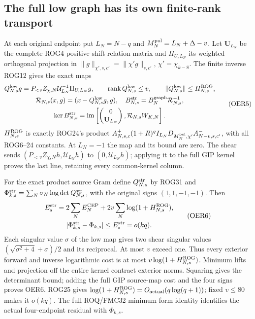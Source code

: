 \documentclass[11pt,a4paper]{article}
\begin{document}
\subsection{The full low graph has its own finite-rank transport}

At each original endpoint put $L_N=N-q$ and
$M_N^{\rm pol}=L_N+\Delta-v$. Let $\mathbf U_{L_N}$ be the
complete ROG4 positive-shift relation matrix and
$\Pi_{U,L_N}$ its weighted orthogonal projection in
$\|g\|_{\chi',s,c'}=\|\chi'g\|_{s,c'}$, $\chi'=\chi_{k-8}$.
The finite inverse ROG12 gives the exact maps
\[
\begin{gathered}
 Q_{N,s}^{\rm low}g
 =P_{<v}Z_{\chi,N}\mathcal U_{L_N}^{-1}\Pi_{U,L_N}g,\qquad
 \operatorname{rank}Q_{N,s}^{\rm low}\le v,\qquad
 \|Q_{N,s}^{\rm low}\|\le H_{N,s}^{\rm ROG},\\
 \mathcal R_{N,s}(x,g)=(x-Q_{N,s}^{\rm low}g,g),\quad
 B_{N,s}^{\rm str}=B_N^{\rm graph}\mathcal R_{N,s}^{-1},\\
 \ker B_{N,s}^{\rm str}
 =\operatorname{im}\left[
   \begin{pmatrix}0\\\mathbf U_{L_N}\end{pmatrix},
                       \mathcal R_{N,s}W_{K,N}\right].
\end{gathered}\tag{OER5}
\]
$H_{N,s}^{\rm ROG}$ is exactly ROG24's product
$A^+_{N,s,c}(1+R)^q I_{L_N}D_{M_N^{\rm pol},\chi'}
A^-_{N-v,s,c'}$, with all ROG6--24 constants.
At $L_N=-1$ the map and its bound are zero.
The shear sends
$(P_{<v}Z_{\chi,N}h,\mathcal U_{L_N}h)$ to
$(0,\mathcal U_{L_N}h)$; applying it to the full GIP kernel
proves the last line, retaining every common-kernel column.

For the exact product source Gram define $Q_{N,s}^{\rm str}$
by ROG31 and
$\Phi_{k,s}^{\rm str}=\sum_N\sigma_N\log\det Q_{N,s}^{\rm str}$,
with the original signs $(1,1,-1,-1)$. Then
\[
\begin{gathered}
 E_s^{\rm str}
 =2\sum_NE_N^{\rm CEP}
       +2v\sum_N\log(1+H_{N,s}^{\rm ROG}),\\
 |\Phi_{k,s}^{\rm str}-\Phi_{k,s}|
       \le E_s^{\rm str}=o(kq).
\end{gathered}\tag{OER6}
\]
Each singular value $\sigma$ of the low map gives two shear
singular values $(\sqrt{\sigma^2+4}+\sigma)/2$ and its reciprocal.
At most $v$ exceed one. Thus every exterior forward and inverse
logarithmic cost is at most $v\log(1+H_{N,s}^{\rm ROG})$.
Minimum lifts and projection off the entire kernel contract
exterior norms. Squaring gives the determinant bound; adding
the full GIP source-map cost and the four signs proves OER6.
ROG25 gives $\log(1+H_{N,s}^{\rm ROG})
=O_{\rm actual}(q\log(q+1))$; fixed $v\le80$ makes it $o(kq)$.
The full ROQ/FMC32 minimum-form identity identifies the actual
four-endpoint residual with $\Phi_{k,s}$.
\end{document}
